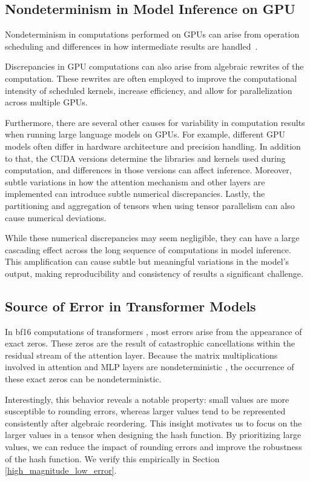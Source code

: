 \documentclass{article}
\theoremstyle{plain}
\theoremstyle{definition}
\theoremstyle{remark}
\begin{document}
\subsection{Nondeterminism in Model Inference on GPU}

Nondeterminism in computations performed on GPUs can arise from operation scheduling and differences in how intermediate results are handled~\citep{pitfalls_of_fp_verification,ieee754_nvidia}.

Discrepancies in GPU computations can also arise from algebraic rewrites of the computation.
These rewrites are often employed to improve the computational intensity of scheduled kernels, increase efficiency, and allow for parallelization across multiple GPUs.

Furthermore, there are several other causes for variability in computation results when running large language models on GPUs.
For example, different GPU models often differ in hardware architecture and precision handling.
In addition to that, the CUDA versions determine the libraries and kernels used during computation, and differences in those versions can affect inference.
Moreover, subtle variations in how the attention mechanism and other layers are implemented can introduce subtle numerical discrepancies.
Lastly, the partitioning and aggregation of tensors when using tensor parallelism can also cause numerical deviations.

While these numerical discrepancies may seem negligible, they can have a large cascading effect across the long sequence of computations in model inference.
This amplification can cause subtle but meaningful variations in the model’s output, making reproducibility and consistency of results a significant challenge.

\subsection{Source of Error in Transformer Models}
\label{tranformer_errors}

In bf16 computations of transformers \citep{attention_is_all_you_need}, most errors arise from the appearance of exact zeros.
These zeros are the result of catastrophic cancellations \citep{goldberg_fperror} within the residual stream of the attention layer.
Because the matrix multiplications involved in attention and MLP layers are nondeterministic \citep{golden2024flashattentionstable}, the occurrence of these exact zeros can be nondeterministic.


Interestingly, this behavior reveals a notable property: small values are more susceptible to rounding errors, whereas larger values tend to be represented consistently after algebraic reordering.
This insight motivates us to focus on the larger values in a tensor when designing the hash function.
By prioritizing large values, we can reduce the impact of rounding errors and improve the robustness of the hash function.
We verify this empirically in Section \ref{high_magnitude_low_error}.
\end{document}
